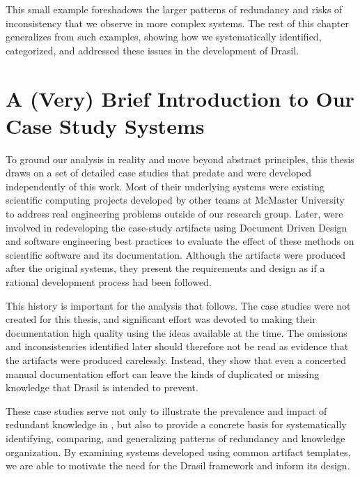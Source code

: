 This small example foreshadows the larger patterns of redundancy and risks of 
inconsistency that we observe in more complex systems. The rest of this chapter 
generalizes from such examples, showing how we systematically identified, 
categorized, and addressed these issues in the development of Drasil.

\section{A (Very) Brief Introduction to Our Case Study Systems}

To ground our analysis in reality and move beyond abstract principles, this
thesis draws on a set of detailed case studies that predate and were developed
independently of this work. Most of their underlying systems were existing
scientific computing projects developed by other teams at McMaster University
to address real engineering problems outside of our research group. Later,
\citet{SmithJegatheesanAndKelly2016} were involved in redeveloping the
case-study artifacts using Document Driven Design and software engineering best
practices to evaluate the effect of these methods on scientific software and
its documentation.
Although the artifacts were produced after the original systems, they present
the requirements and design as if a rational development process had been
followed.

This history is important for the analysis that follows. The case studies were
not created for this thesis, and significant effort was devoted to making their
documentation high quality using the ideas available at the time. The
omissions and inconsistencies identified later should therefore not be read as
evidence that the artifacts were produced carelessly. Instead, they show that
even a concerted manual documentation effort can leave the kinds of duplicated
or missing knowledge that Drasil is intended to prevent.

These case studies serve not only to illustrate the prevalence and impact of
redundant knowledge in \sfs{}, but also to provide a concrete basis for
systematically identifying, comparing, and generalizing patterns of redundancy
and knowledge organization. By examining systems developed using common
artifact templates, we are able to motivate the need for the Drasil framework
and inform its design.


